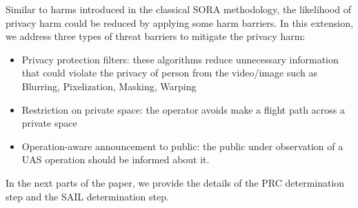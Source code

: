 \documentclass[a4paper, 10, conference]{ieeeconf}  %
\begin{document}
Similar to harms introduced in the classical SORA methodology, the likelihood of privacy harm could be reduced by applying some harm barriers. In this extension, we address three types of threat barriers to mitigate the privacy harm: 

\begin{itemize}
    \item Privacy protection filters: these algorithms reduce unnecessary information that could violate the privacy of person from the video/image such as Blurring, Pixelization, Masking, Warping \cite{7285023}  
    \item Restriction on private space: the operator avoids make a flight path across a private space \cite{8328983}
    \item Operation-aware announcement to public: the public under observation of a UAS operation should be informed about it.
\end{itemize}

In the next parts of the paper, we provide the details of the  PRC determination step and the SAIL determination step.
\end{document}

